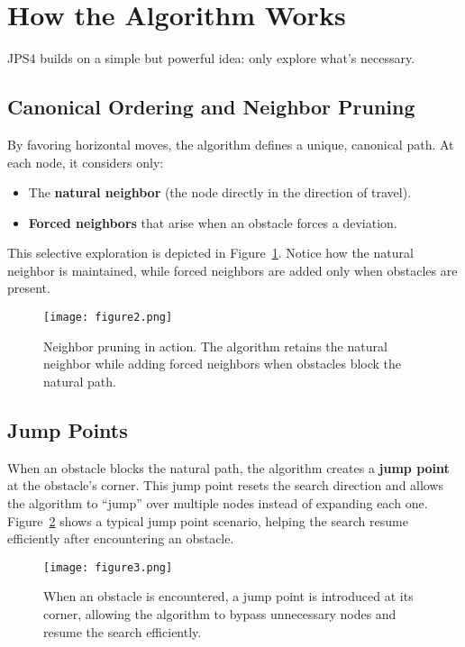 \documentclass[11pt]{article}
\begin{document}
\section{How the Algorithm Works}
JPS4 builds on a simple but powerful idea: only explore what’s necessary.

\subsection*{Canonical Ordering and Neighbor Pruning}
By favoring horizontal moves, the algorithm defines a unique, canonical path. At each node, it considers only:
\begin{itemize}
    \item The \textbf{natural neighbor} (the node directly in the direction of travel).
    \item \textbf{Forced neighbors} that arise when an obstacle forces a deviation.
\end{itemize}
This selective exploration is depicted in Figure~\ref{fig:pruning}. Notice how the natural neighbor is maintained, while forced neighbors are added only when obstacles are present.

\begin{figure}[H]
    \centering
    \texttt{[image: figure2.png]}
    \caption{Neighbor pruning in action. The algorithm retains the natural neighbor while adding forced neighbors when obstacles block the natural path.}
    \label{fig:pruning}
\end{figure}

\subsection*{Jump Points}
When an obstacle blocks the natural path, the algorithm creates a \textbf{jump point} at the obstacle's corner. This jump point resets the search direction and allows the algorithm to “jump” over multiple nodes instead of expanding each one. Figure~\ref{fig:jump} shows a typical jump point scenario, helping the search resume efficiently after encountering an obstacle.

\begin{figure}[H]
    \centering
    \texttt{[image: figure3.png]}
    \caption{When an obstacle is encountered, a jump point is introduced at its corner, allowing the algorithm to bypass unnecessary nodes and resume the search efficiently.}
    \label{fig:jump}
\end{figure}
\end{document}
